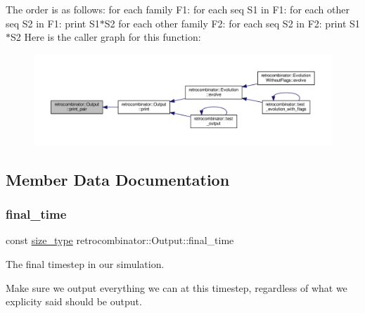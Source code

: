 The order is as follows\+: for each family F1\+: for each seq S1 in F1\+: for each other seq S2 in F1\+: print S1$\ast$\+S2 for each other family F2\+: for each seq S2 in F2\+: print S1$\ast$\+S2 Here is the caller graph for this function\+:
\nopagebreak
\begin{figure}[H]
\begin{center}
\leavevmode
\includegraphics[width=350pt]{classretrocombinator_1_1Output_ac5632b57357788ba7d25769c412a2a11_icgraph}
\end{center}
\end{figure}


\subsection{Member Data Documentation}
\mbox{\label{classretrocombinator_1_1Output_a94f5e60b0aafcc409c78507c5e34ba7a}} 
\subsubsection{\texorpdfstring{final\+\_\+time}{final\_time}}
{\footnotesize\ttfamily const \hyperlink{constants_8h_a8e1541b50cee66a791df4c437ccbb385}{size\+\_\+type} retrocombinator\+::\+Output\+::final\+\_\+time\hspace{0.3cm}{\ttfamily [private]}}



The final timestep in our simulation. 

Make sure we output everything we can at this timestep, regardless of what we explicity said should be output. \mbox{\label{classretrocombinator_1_1Output_a52a175aea7babe70c97021c0ccc47b4f}} 
